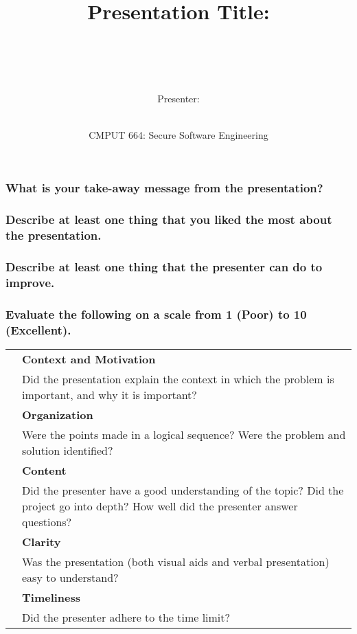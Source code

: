 \documentclass{article}
\title{Presentation Title: ~~~~~~~~~~~~~~~~~~~~~~~~~~~~~~~~~~~~~~~~~}
\author{Presenter: ~~~~~~~~~~~~~~~~~~~~~~~~~~~~~~~~~~~~~~~~~~~~~~~~~~~~~~~~~~~~~~~~~~~~~~~~}
\date{CMPUT 664: Secure Software Engineering}
\begin{document}
\maketitle

\subsubsection*{What is your take-away message from the presentation?}
\vspace{2cm}



\subsubsection*{Describe at least one thing that you liked the most about the presentation.}
\vspace{3cm}



\subsubsection*{Describe at least one thing that the presenter can do to improve.}
\vspace{3cm}


\subsubsection*{Evaluate the following on a scale from 1 (Poor) to 10 (Excellent).}

\begin{table}[h]
\begin{tabularx}{\textwidth}{| p{1cm} | X |}
	\hline
	& \textbf{Context and Motivation} \\
	& Did the presentation explain the context in which the problem is important, and why it is important? \\ \hline
	& \textbf{Organization} \\ 
	& Were the points made in a logical sequence? Were the problem and solution identified? \\ \hline
	& \textbf{Content} \\ 
	& Did the presenter have a good understanding of the topic? Did the project go into depth? How well did the presenter answer questions? \\ \hline
	& \textbf{Clarity} \\ 
	& Was the presentation (both visual aids and verbal presentation) easy to understand? \\ \hline
	& \textbf{Timeliness} \\
	& Did the presenter adhere to the time limit? \\ \hline 
\end{tabularx}
\end{table}
\end{document}
